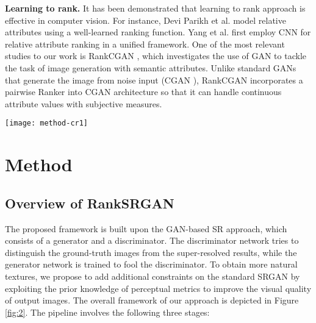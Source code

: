 \documentclass[10pt,twocolumn,letterpaper]{article}
\begin{document}
\textbf{Learning to rank.} It has been demonstrated that learning to rank approach is effective in computer vision. For instance, Devi Parikh et al.  \cite{parikh2011relative} model relative attributes using a well-learned ranking function. Yang et al. \cite{yang2016deep} first employ CNN for relative attribute ranking in a unified framework. One of the most relevant studies to our work is RankCGAN \cite{saquil2018ranking}, which investigates the use of GAN to tackle the task of image generation with semantic attributes. Unlike standard GANs that generate the image from noise input (CGAN \cite{mirza2014conditional}), RankCGAN incorporates a pairwise Ranker into CGAN architecture so that it can handle continuous attribute values with subjective measures. 

\begin{figure*}[h!]
\setlength{\abovecaptionskip}{-0.4cm}
\setlength{\belowcaptionskip}{-0.2cm}
\begin{center}
\texttt{[image: method-cr1]} 
\end{center}
   \caption{\textbf{Overview of the proposed method.} \textbf{Stage 1:} Generate pair-wise rank images by different SR models in the orientation of perceptual metrics. \textbf{Stage 2:} Train Siamese-like Ranker network. \textbf{Stage 3:} Introduce rank-content loss derived from well-trained Ranker to guide GAN training. RankSRGAN consists of a generator(G), discriminator(D), a fixed Feature extractor(F) and Ranker(R). }
\label{fig:2}
\vskip -0.25cm
\end{figure*}

\section{Method}
\label{sec:3}



\subsection{Overview of RankSRGAN}
The proposed framework is built upon the GAN-based \cite{ledig2017photo} SR approach, which consists of a generator and a discriminator. The discriminator network tries to distinguish the ground-truth images from the super-resolved results, while the generator network is trained to fool the discriminator. To obtain more natural textures, we propose to add additional constraints on the standard SRGAN \cite{ledig2017photo} by exploiting the prior knowledge of perceptual metrics to improve the visual quality of output images. The overall framework of our approach is depicted in Figure \ref{fig:2}. The pipeline involves the following three stages:
\end{document}
